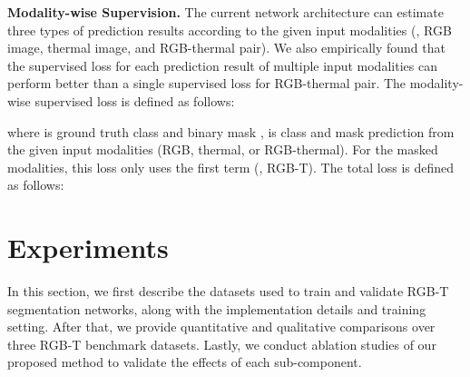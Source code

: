 \documentclass[10pt,twocolumn,letterpaper]{article}
\begin{document}
\textbf{Modality-wise Supervision.} The current network architecture can estimate three types of prediction results according to the given input modalities (\ie, RGB image, thermal image, and RGB-thermal pair).
We also empirically found that the supervised loss for each prediction result of multiple input modalities can perform better than a single supervised loss for RGB-thermal pair.
The modality-wise supervised loss is defined as follows:

where  is ground truth class  and binary mask ,  is class and mask prediction from the given input modalities (RGB, thermal, or RGB-thermal). For the masked modalities, this loss only uses the first term (\ie, RGB-T). 
The total loss is defined as follows: 




 \section{Experiments}
\label{sec:experiments}
In this section, we first describe the datasets used to train and validate RGB-T segmentation networks, along with the implementation details and training setting. 
After that, we provide quantitative and qualitative comparisons over three RGB-T benchmark datasets.
Lastly, we conduct ablation studies of our proposed method to validate the effects of each sub-component.
\end{document}
